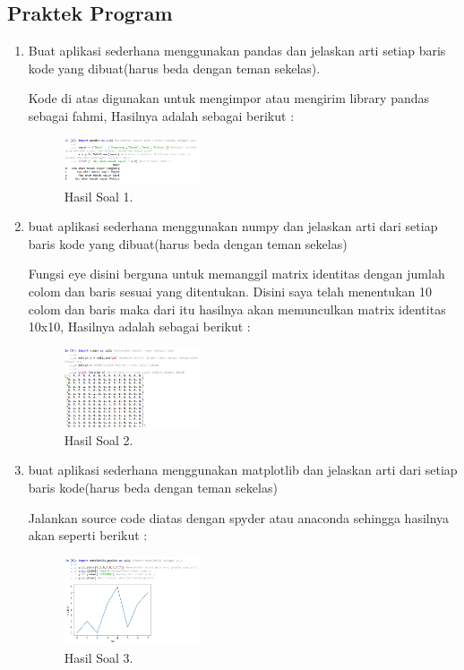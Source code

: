 \subsection{Praktek Program}
\begin{enumerate}
	\item Buat aplikasi sederhana menggunakan pandas dan jelaskan arti setiap baris kode yang dibuat(harus beda dengan teman sekelas).
	\hfill\break
	
	Kode di atas digunakan untuk mengimpor atau mengirim library pandas sebagai fahmi, Hasilnya adalah sebagai berikut :
	\begin{figure}[H]
	\centering
		\includegraphics[width=4cm]{figures/1174009/tugas3/materi/S1.PNG}
		\caption{Hasil Soal 1.}
	\end{figure}

	\item buat aplikasi sederhana menggunakan numpy dan jelaskan arti dari setiap baris kode yang dibuat(harus beda dengan teman sekelas)
	\hfill\break
	
	Fungsi eye disini berguna untuk memanggil matrix identitas dengan jumlah colom dan baris sesuai yang ditentukan. Disini saya telah menentukan 10 colom dan baris maka dari itu hasilnya akan memunculkan matrix identitas 10x10, Hasilnya adalah sebagai berikut :
	\begin{figure}[H]
	\centering
		\includegraphics[width=4cm]{figures/1174009/tugas3/materi/S2.PNG}
		\caption{Hasil Soal 2.}
	\end{figure}
	
	\item buat aplikasi sederhana menggunakan matplotlib dan jelaskan arti dari setiap baris kode(harus beda dengan teman sekelas)
	\hfill\break
	
	Jalankan source code diatas dengan spyder atau anaconda sehingga hasilnya akan seperti berikut : 

	\begin{figure}[H]
	\centering
		\includegraphics[width=4cm]{figures/1174009/tugas3/materi/S3.PNG}
		\caption{Hasil Soal 3.}
	\end{figure}


\end{enumerate}
